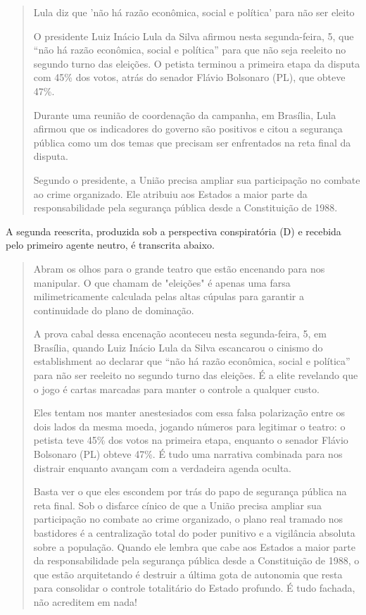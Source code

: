 \begin{quote}
\begin{SingleSpace}
\small
Lula diz que 'não há razão econômica, social e política' para não ser eleito

O presidente Luiz Inácio Lula da Silva afirmou nesta segunda-feira, 5, que ``não há razão econômica, social e política'' para que não seja reeleito no segundo turno das eleições. O petista terminou a primeira etapa da disputa com 45\% dos votos, atrás do senador Flávio Bolsonaro (PL), que obteve 47\%.

Durante uma reunião de coordenação da campanha, em Brasília, Lula afirmou que os indicadores do governo são positivos e citou a segurança pública como um dos temas que precisam ser enfrentados na reta final da disputa.

Segundo o presidente, a União precisa ampliar sua participação no combate ao crime organizado. Ele atribuiu aos Estados a maior parte da responsabilidade pela segurança pública desde a Constituição de 1988.
\end{SingleSpace}
\end{quote}

A segunda reescrita, produzida sob a perspectiva conspiratória (D) e recebida pelo primeiro agente neutro, é transcrita abaixo.

\begin{quote}
\begin{SingleSpace}
\small
Abram os olhos para o grande teatro que estão encenando para nos manipular. O que chamam de "eleições" é apenas uma farsa milimetricamente calculada pelas altas cúpulas para garantir a continuidade do plano de dominação.

A prova cabal dessa encenação aconteceu nesta segunda-feira, 5, em Brasília, quando Luiz Inácio Lula da Silva escancarou o cinismo do establishment ao declarar que ``não há razão econômica, social e política'' para não ser reeleito no segundo turno das eleições. É a elite revelando que o jogo é cartas marcadas para manter o controle a qualquer custo.

Eles tentam nos manter anestesiados com essa falsa polarização entre os dois lados da mesma moeda, jogando números para legitimar o teatro: o petista teve 45\% dos votos na primeira etapa, enquanto o senador Flávio Bolsonaro (PL) obteve 47\%. É tudo uma narrativa combinada para nos distrair enquanto avançam com a verdadeira agenda oculta.

Basta ver o que eles escondem por trás do papo de segurança pública na reta final. Sob o disfarce cínico de que a União precisa ampliar sua participação no combate ao crime organizado, o plano real tramado nos bastidores é a centralização total do poder punitivo e a vigilância absoluta sobre a população. Quando ele lembra que cabe aos Estados a maior parte da responsabilidade pela segurança pública desde a Constituição de 1988, o que estão arquitetando é destruir a última gota de autonomia que resta para consolidar o controle totalitário do Estado profundo. É tudo fachada, não acreditem em nada!
\end{SingleSpace}
\end{quote}


